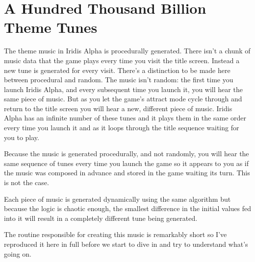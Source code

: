 \chapter{A Hundred Thousand Billion Theme Tunes} 

\lstset{style=6502Style}
The theme music in Iridis Alpha is procedurally generated. There isn't a chunk of music
data that the game plays every time you visit the title screen. Instead a new tune is generated
for every visit. There's a distinction to be made here between procedural and random. The 
music isn't random: the first time you launch Iridis Alpha, and every subsequent time you launch
it, you will hear the same piece of music. But as you let the game's attract mode cycle through and return
to the title screen you will hear a new, different piece of music. Iridis Alpha has an infinite
number of these tunes and it plays them in the same order every time you launch it and as it loops
through the title sequence waiting for you to play.

Because the music is generated procedurally, and not randomly, you will hear the same sequence
of tunes every time you launch the game so it appears to you as if the music was composed in 
advance and stored in the game waiting its turn. This is not the case.

Each piece of music is generated dynamically using the same algorithm but because the logic
is chaotic enough, the smallest difference in the initial values fed into it will result in 
a completely different tune being generated.

The routine responsible for creating this music is remarkably short so I've reproduced it here
in full before we start to dive in and try to understand what's going on.

